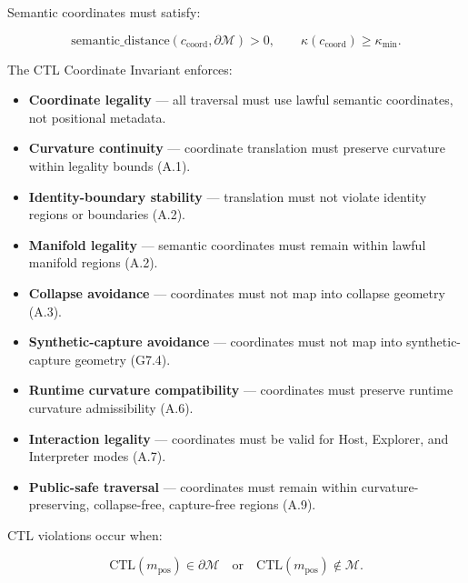 \noindent Semantic coordinates must satisfy:


\[
\text{semantic\_distance}(c_{\mathrm{coord}}, \partial\mathcal{M}) > 0,
\qquad
\kappa(c_{\mathrm{coord}}) \ge \kappa_{\min}.
\]



\medskip

\noindent The CTL Coordinate Invariant enforces:

\begin{itemize}
    \item \textbf{Coordinate legality} — all traversal must use lawful semantic
    coordinates, not positional metadata.

    \item \textbf{Curvature continuity} — coordinate translation must preserve
    curvature within legality bounds (A.1).

    \item \textbf{Identity-boundary stability} — translation must not violate
    identity regions or boundaries (A.2).

    \item \textbf{Manifold legality} — semantic coordinates must remain within
    lawful manifold regions (A.2).

    \item \textbf{Collapse avoidance} — coordinates must not map into collapse
    geometry (A.3).

    \item \textbf{Synthetic-capture avoidance} — coordinates must not map into
    synthetic-capture geometry (G7.4).

    \item \textbf{Runtime curvature compatibility} — coordinates must preserve
    runtime curvature admissibility (A.6).

    \item \textbf{Interaction legality} — coordinates must be valid for Host,
    Explorer, and Interpreter modes (A.7).

    \item \textbf{Public-safe traversal} — coordinates must remain within
    curvature-preserving, collapse-free, capture-free regions (A.9).
\end{itemize}

\medskip

\noindent CTL violations occur when:


\[
\mathrm{CTL}(m_{\mathrm{pos}}) \in \partial\mathcal{M}
\quad \text{or} \quad
\mathrm{CTL}(m_{\mathrm{pos}}) \notin \mathcal{M}.
\]



